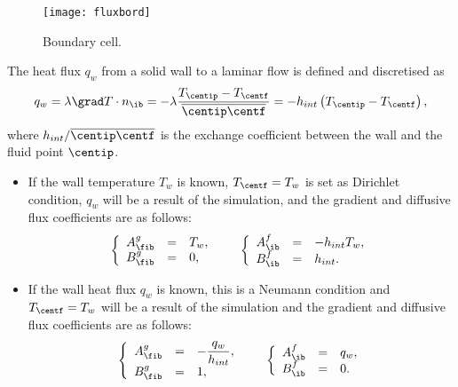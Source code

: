 \begin{figure}[!htpb]
\centering
\texttt{[image: fluxbord]}
\caption{Boundary cell.\label{fig:bndcnd:boundary_flux}}
\end{figure}

\begin{example}\label{sec:bndcnd:intro}
The heat flux $q_w$ from a solid wall to a laminar flow is defined and discretised as
\begin{equation}
q_w = \lambda \grad T \cdot n_\ib = - \lambda \dfrac{T_\centip -T_\centf}{ \overline{\centip \centf}} = -h_{int} \left(T_\centip - T_\centf \right),
\end{equation}
where $h_{int} / \overline{\centip \centf}$ is the exchange coefficient between the wall and the fluid point $\centip$.

\begin{itemize}
\item If the wall temperature $T_w$ is known, $T_\centf =T_w$ is set as Dirichlet condition, $q_w$
will be a result of the simulation, and the gradient and diffusive flux coefficients
are as follows:
\begin{equation}
\begin{array}{r c l}
\left\lbrace
\begin{array}{r c l}
A^g_\fib & = & T_w , \\
B^g_\fib & = & 0,
\end{array}
\right.
 & &
\left\lbrace
\begin{array}{r c l}
A^f_\ib & = & -h_{int} T_w, \\
B^f_\ib & = & h_{int}.
\end{array}
\right.
\end{array}
\end{equation}

\item If the wall heat flux $q_w$ is known, this is a Neumann condition and $T_\centf = T_w$
will be a result of the simulation and the gradient and diffusive flux coefficients
are as follows:
\begin{equation}
\begin{array}{r c l}
\left\lbrace
\begin{array}{r c l}
A^g_\fib & = & - \dfrac{q_w}{h_{int}} ,\\
B^g_\fib & = & 1,
\end{array}
\right.
& &
\left\lbrace
\begin{array}{r c l}
A^f_\ib & = & q_w ,\\
B^f_\ib & = & 0 .
\end{array}
\right.
\end{array}
\end{equation}

\end{itemize}
\end{example}

